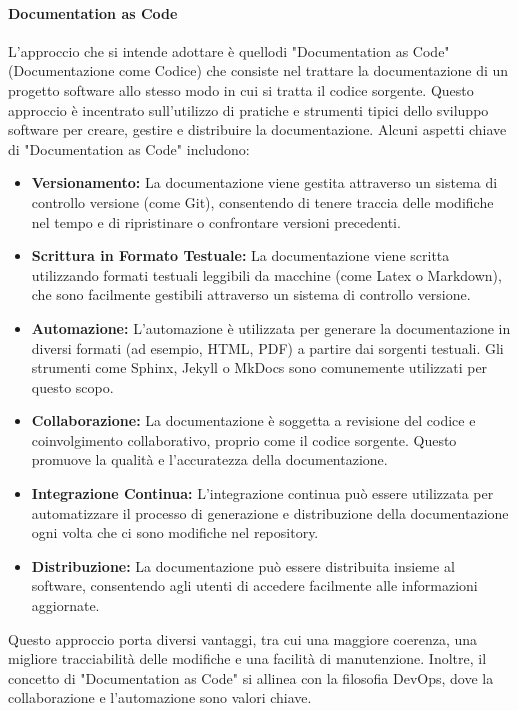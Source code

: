 \documentclass{article}
\begin{document}
    \paragraph{Documentation as Code}
    L'approccio che si intende adottare è quellodi "Documentation as Code" (Documentazione come Codice) che consiste nel trattare la documentazione di un progetto software allo stesso modo in cui si tratta il codice sorgente. Questo approccio è incentrato sull'utilizzo di pratiche e strumenti tipici dello sviluppo software per creare, gestire e distribuire la documentazione.
    Alcuni aspetti chiave di "Documentation as Code" includono:
\begin{itemize}
\item \textbf{Versionamento:}
La documentazione viene gestita attraverso un sistema di controllo versione (come Git), consentendo di tenere traccia delle modifiche nel tempo e di ripristinare o confrontare versioni precedenti.

\item \textbf{Scrittura in Formato Testuale:}
La documentazione viene scritta utilizzando formati testuali leggibili da macchine (come Latex o Markdown), che sono facilmente gestibili attraverso un sistema di controllo versione.

\item \textbf{Automazione:}
L'automazione è utilizzata per generare la documentazione in diversi formati (ad esempio, HTML, PDF) a partire dai sorgenti testuali. Gli strumenti come Sphinx, Jekyll o MkDocs sono comunemente utilizzati per questo scopo.

\item \textbf{Collaborazione:}
La documentazione è soggetta a revisione del codice e coinvolgimento collaborativo, proprio come il codice sorgente. Questo promuove la qualità e l'accuratezza della documentazione.

\item \textbf{Integrazione Continua:}
L'integrazione continua può essere utilizzata per automatizzare il processo di generazione e distribuzione della documentazione ogni volta che ci sono modifiche nel repository.

\item \textbf{Distribuzione:}
La documentazione può essere distribuita insieme al software, consentendo agli utenti di accedere facilmente alle informazioni aggiornate.
\end{itemize}
Questo approccio porta diversi vantaggi, tra cui una maggiore coerenza, una migliore tracciabilità delle modifiche e una facilità di manutenzione. Inoltre, il concetto di "Documentation as Code" si allinea con la filosofia DevOps, dove la collaborazione e l'automazione sono valori chiave.\\
\end{document}
